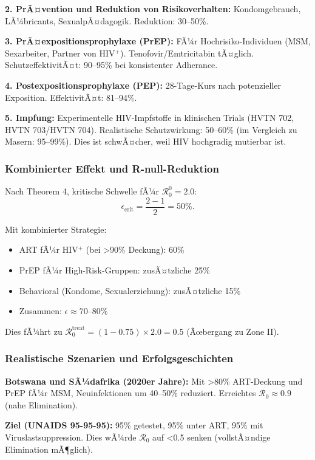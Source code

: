 ﻿\documentclass[a4paper,12pt,twoside]{article}
\theoremstyle{definition}
\begin{document}
\textbf{2. PrÃ¤vention und Reduktion von Risikoverhalten:} Kondomgebrauch, LÃ¼bricants, SexualpÃ¤dagogik. Reduktion: 30--50\%.

\textbf{3. PrÃ¤expositionsprophylaxe (PrEP):} FÃ¼r Hochrisiko-Individuen (MSM, Sexarbeiter, Partner von HIV$^+$). Tenofovir/Emtricitabin tÃ¤glich. SchutzeffektivitÃ¤t: 90--95\% bei konsistenter Adherance.

\textbf{4. Postexpositionsprophylaxe (PEP):} 28-Tage-Kurs nach potenzieller Exposition. EffektivitÃ¤t: 81--94\%.

\textbf{5. Impfung:} Experimentelle HIV-Impfstoffe in klinischen Trials (HVTN 702, HVTN 703/HVTN 704). Realistische Schutzwirkung: 50--60\% (im Vergleich zu Masern: 95--99\%). Dies ist schwÃ¤cher, weil HIV hochgradig mutierbar ist.

\subsubsection{Kombinierter Effekt und R-null-Reduktion}

Nach Theorem 4, kritische Schwelle fÃ¼r $\mathcal{R}_0^0 = 2.0$:
\[
\epsilon_{\text{crit}} = \frac{2 - 1}{2} = 50\%.
\]

Mit kombinierter Strategie:
\begin{itemize}
\item ART fÃ¼r HIV$^+$ (bei >90\% Deckung): 60\%
\item PrEP fÃ¼r High-Risk-Gruppen: zusÃ¤tzliche 25\%
\item Behavioral (Kondome, Sexualerziehung): zusÃ¤tzliche 15\%
\item Zusammen: $\epsilon \approx 70 \text{--} 80\%$
\end{itemize}

Dies fÃ¼hrt zu $\mathcal{R}_0^{\text{treat}} = (1 - 0.75) \times 2.0 = 0.5$ (Ãœbergang zu Zone II).

\subsubsection{Realistische Szenarien und Erfolgsgeschichten}

\textbf{Botswana und SÃ¼dafrika (2020er Jahre):} Mit >80\% ART-Deckung und PrEP fÃ¼r MSM, Neuinfektionen um 40--50\% reduziert. Erreichtes $\mathcal{R}_0 \approx 0.9$ (nahe Elimination).

\textbf{Ziel (UNAIDS 95-95-95):} 95\% getestet, 95\% unter ART, 95\% mit Viruslastsuppression. Dies wÃ¼rde $\mathcal{R}_0$ auf <0.5 senken (vollstÃ¤ndige Elimination mÃ¶glich).
\end{document}
